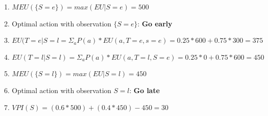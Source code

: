 \documentclass[12pt]{article}
\begin{document}
\begin{enumerate}
\begin{enumerate}
\item $MEU( \{ S=e \} ) = max(EU | S=e) = 500$

\item Optimal action with observation $\{S = e\}$: \textbf{Go early}

\item $EU(T = e | S = l =  \Sigma_a P(a) * EU(a, T = e, s = e) = 0.25 * 600 + 0.75 * 300 = 375$

\item $EU(T = l | S = l) =  \Sigma_a P(a) * EU(a, T = l, S = e) = 0.25 * 0 + 0.75 * 600 = 450$

\item $MEU( \{ S=l \} ) = max(EU | S=l) = 450$

\item Optimal action with observation $S = l$: \textbf{Go late}

\item $VPI(S) = (0.6 * 500) + (0.4 * 450) - 450 = 30$

\end{enumerate}

\end{enumerate}








\end{document}
